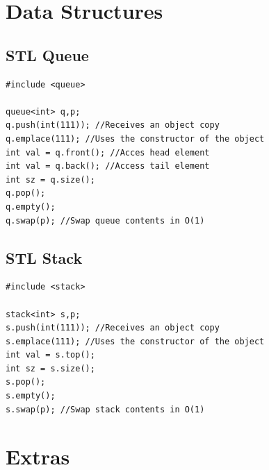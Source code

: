 \documentclass[twoside]{article}
\begin{document}
\selectfont
    \begin{multicols*}{2}
    \color{coolgray}
        \tableofcontents
        \newpage
\sectionfont{\bfseries\sffamily\centering\Huge}
\vspace{1em}
\section*{Data Structures}
\vspace{3em}
\subsectionfont{\large\bfseries\sffamily\underline}
\subsection*{STL Queue}
\begin{verbatim}
#include <queue>

queue<int> q,p;
q.push(int(111)); //Receives an object copy
q.emplace(111); //Uses the constructor of the object
int val = q.front(); //Acces head element
int val = q.back(); //Access tail element
int sz = q.size();
q.pop();
q.empty();
q.swap(p); //Swap queue contents in O(1)

\end{verbatim}

\subsectionfont{\large\bfseries\sffamily\underline}
\subsection*{STL Stack}
\begin{verbatim}
#include <stack>

stack<int> s,p;
s.push(int(111)); //Receives an object copy
s.emplace(111); //Uses the constructor of the object
int val = s.top();
int sz = s.size();
s.pop();
s.empty();
s.swap(p); //Swap stack contents in O(1)

\end{verbatim}

\sectionfont{\bfseries\sffamily\centering\Huge}
\vspace{1em}
\section*{Extras}
\vspace{3em}
\subsectionfont{\large\bfseries\sffamily\underline}

\end{multicols*}
\end{document}
